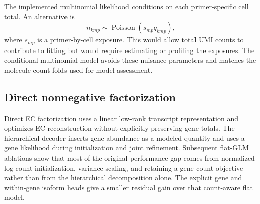 \documentclass[11pt]{article}
\begin{document}
The implemented multinomial likelihood conditions on each primer-specific
cell total. An alternative is
\[
  n_{kmp}\sim\operatorname{Poisson}(s_{mp}q_{kmp}),
\]
where \(s_{mp}\) is a primer-by-cell exposure. This would allow total UMI
counts to contribute to fitting but would require estimating or profiling the
exposures. The conditional multinomial model avoids these nuisance parameters
and matches the molecule-count folds used for model assessment.

\subsection*{Direct nonnegative factorization}

Direct EC factorization uses a linear low-rank transcript representation and
optimizes EC reconstruction without explicitly preserving gene totals. The
hierarchical decoder inserts gene abundance as a modeled quantity and uses a
gene likelihood during initialization and joint refinement. Subsequent
flat-GLM ablations show that most of the original performance gap comes from
normalized log-count initialization, variance scaling, and retaining a
gene-count objective rather than from the hierarchical decomposition alone.
The explicit gene and within-gene isoform heads give a smaller residual gain
over that count-aware flat model.
\end{document}
